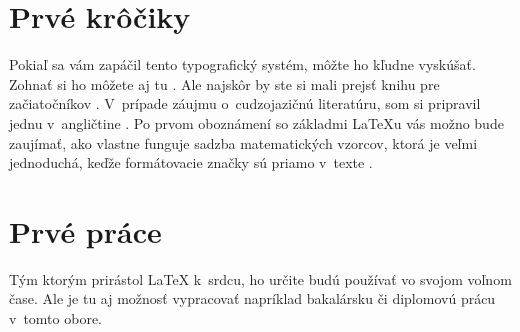 \documentclass[a4paper, 11pt]{article}
\begin{document}
\section{Prvé krôčiky}

Pokiaľ sa vám zapáčil tento typografický systém, môžte ho kľudne vyskúšať. Zohnať si ho môžete aj tu \cite{Martinek:Latex}. Ale najskôr by ste si mali prejsť knihu pre začiatočníkov \cite{Rybicka:Zacatecniky}. V~prípade záujmu o~cudzojazičnú literatúru, som si pripravil jednu v~angličtine \cite{Helmut:Guide}. Po prvom oboznámení so základmi {\LaTeX}u vás možno bude zaujímať, ako vlastne funguje sadzba matematických vzorcov, ktorá je veľmi jednoduchá, keďže formátovacie značky sú priamo v~texte \cite{Math:Latex}.

\section{Prvé práce}

Tým ktorým prirástol {\LaTeX} k~srdcu, ho určite budú používať vo svojom voľnom čase. Ale je tu aj možnosť vypracovať napríklad bakalársku \cite{Simek:Editor} či diplomovú \cite{Bednar:OpenType} prácu v~tomto obore.

\newpage


\end{document}
